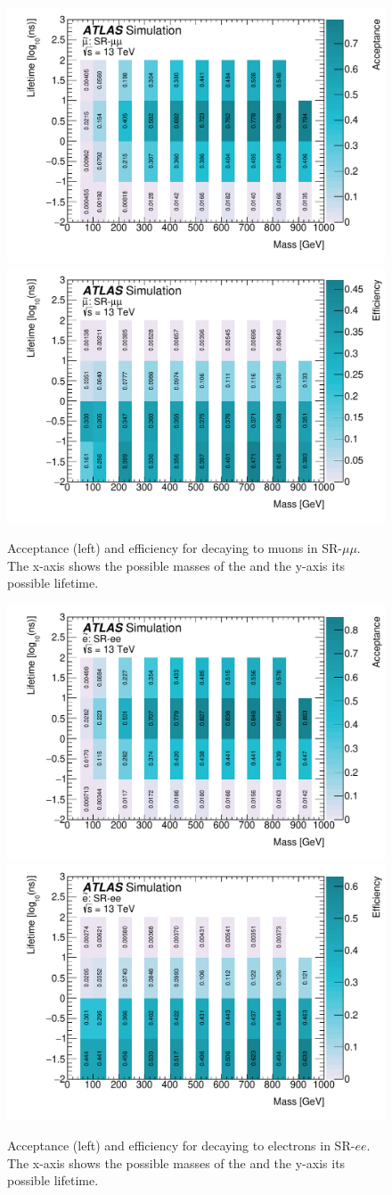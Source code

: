 \begin{figure}[htbp]
\centering
\includegraphics[width=.48\textwidth]{figures/event_selection/slep_acc_mm.pdf}
\includegraphics[width=.48\textwidth]{figures/event_selection/slep_eff_mm.pdf}
\caption{Acceptance (left) and efficiency for \smu decaying to muons in SR-$\mu\mu$. The x-axis shows the possible masses of the \smu and the y-axis its possible lifetime.}
\label{fig:acc-eff-mm}
\end{figure}

\begin{figure}[htbp]
\centering
\includegraphics[width=.48\textwidth]{figures/event_selection/slep_acc_ee.pdf}
\includegraphics[width=.48\textwidth]{figures/event_selection/slep_eff_ee.pdf}
\caption{Acceptance (left) and efficiency for \selec decaying to electrons in SR-$ee$. The x-axis shows the possible masses of the \selec and the y-axis its possible lifetime.}
\label{fig:acc-eff-ee}
\end{figure}

